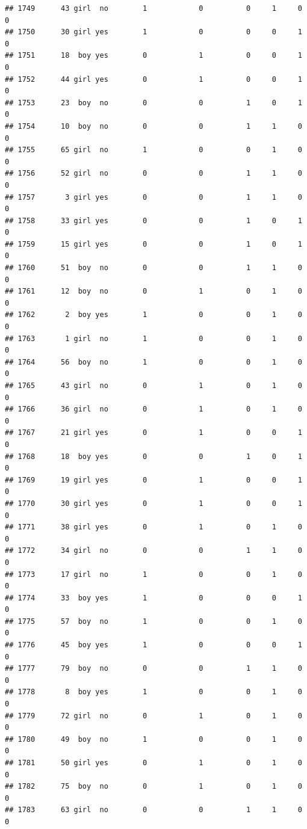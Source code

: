 \documentclass[man]{apa6}
\begin{document}
\begin{verbatim}
## 1749      43 girl  no        1            0          0     1     0     0
## 1750      30 girl yes        1            0          0     0     1     0
## 1751      18  boy yes        0            1          0     0     1     0
## 1752      44 girl yes        0            1          0     0     1     0
## 1753      23  boy  no        0            0          1     0     1     0
## 1754      10  boy  no        0            0          1     1     0     0
## 1755      65 girl  no        1            0          0     1     0     0
## 1756      52 girl  no        0            0          1     1     0     0
## 1757       3 girl yes        0            0          1     1     0     0
## 1758      33 girl yes        0            0          1     0     1     0
## 1759      15 girl yes        0            0          1     0     1     0
## 1760      51  boy  no        0            0          1     1     0     0
## 1761      12  boy  no        0            1          0     1     0     0
## 1762       2  boy yes        1            0          0     1     0     0
## 1763       1 girl  no        1            0          0     1     0     0
## 1764      56  boy  no        1            0          0     1     0     0
## 1765      43 girl  no        0            1          0     1     0     0
## 1766      36 girl  no        0            1          0     1     0     0
## 1767      21 girl yes        0            1          0     0     1     0
## 1768      18  boy yes        0            0          1     0     1     0
## 1769      19 girl yes        0            1          0     0     1     0
## 1770      30 girl yes        0            1          0     0     1     0
## 1771      38 girl yes        0            1          0     1     0     0
## 1772      34 girl  no        0            0          1     1     0     0
## 1773      17 girl  no        1            0          0     1     0     0
## 1774      33  boy yes        1            0          0     0     1     0
## 1775      57  boy  no        1            0          0     1     0     0
## 1776      45  boy yes        1            0          0     0     1     0
## 1777      79  boy  no        0            0          1     1     0     0
## 1778       8  boy yes        1            0          0     1     0     0
## 1779      72 girl  no        0            1          0     1     0     0
## 1780      49  boy  no        1            0          0     1     0     0
## 1781      50 girl yes        0            1          0     1     0     0
## 1782      75  boy  no        0            1          0     1     0     0
## 1783      63 girl  no        0            0          1     1     0     0

\end{verbatim}
\end{document}
